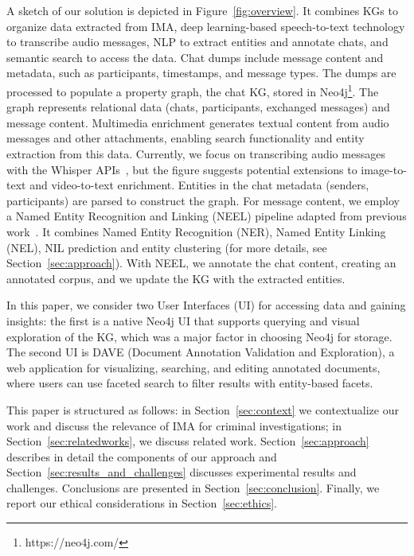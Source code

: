 A sketch of our solution is depicted in Figure~\ref{fig:overview}. It combines KGs to organize data extracted from IMA, deep learning-based speech-to-text technology to transcribe audio messages, NLP to extract entities and annotate chats, and semantic search to access the data.
Chat dumps include message content and metadata, such as participants, timestamps, and message types. The dumps are processed to populate a property graph, the chat KG, stored in Neo4j\footnote{https://neo4j.com/}. The graph represents relational data (chats, participants, exchanged messages) and message content. Multimedia enrichment generates textual content from audio messages and other attachments, enabling search functionality and entity extraction from this data. Currently, we focus on transcribing audio messages with the Whisper APIs~\cite{radford23a-whisper}, but the figure suggests potential extensions to image-to-text and video-to-text enrichment.
Entities in the chat metadata (senders, participants) are parsed to construct the graph. For message content, we employ a Named Entity Recognition and Linking (NEEL) pipeline adapted from previous work~\cite{ijckg2022,aixia_2023}.
It combines Named Entity Recognition (NER), Named Entity Linking (NEL), NIL prediction and entity clustering (for more details, see Section~\ref{sec:approach}).
With NEEL, we annotate the chat content, creating an annotated corpus, and we update the KG with the extracted entities.

In this paper, we consider two User Interfaces (UI) for accessing data and gaining insights:
the first is a native Neo4j UI that supports querying and visual exploration of the KG, which was a major factor in choosing Neo4j for storage. The second UI is DAVE (Document Annotation Validation and Exploration), a web application for visualizing, searching, and editing annotated documents, where users can use faceted search to filter results with entity-based facets. 

This paper is structured as follows: in Section~\ref{sec:context} we contextualize our work and discuss the relevance of IMA for criminal investigations; in Section~\ref{sec:relatedworks}, we discuss related work. Section~\ref{sec:approach} describes in detail the components of our approach and Section~\ref{sec:results_and_challenges} discusses experimental results and challenges. Conclusions are presented in Section~\ref{sec:conclusion}.
Finally, we report our ethical considerations in Section~\ref{sec:ethics}.


